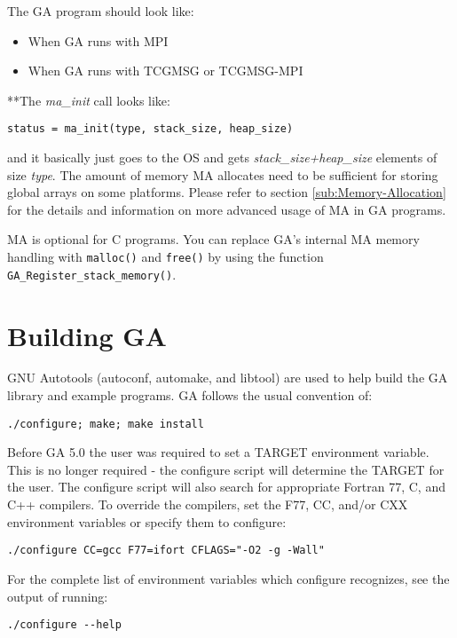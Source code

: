 The GA program should look like:
\begin{itemize}
\item When GA runs with MPI
\end{itemize}


\begin{itemize}
\item When GA runs with TCGMSG or TCGMSG-MPI
\end{itemize}


{*}{*}The \emph{ma\_init} call looks like:
\begin{verbatim}
status = ma_init(type, stack_size, heap_size)
\end{verbatim}
and it basically just goes to the OS and gets \emph{stack\_size+heap\_size}
elements of size \emph{type}. The amount of memory MA allocates need to be
sufficient for storing global arrays on some platforms. Please refer to section
\ref{sub:Memory-Allocation} for the details and information on more advanced
usage of MA in GA programs. 

MA is optional for C programs. You can replace GA's internal MA memory handling
with \texttt{malloc()} and \texttt{free()} by using the function
\texttt{GA\_Register\_stack\_memory()}.


\section{Building GA}

GNU Autotools (autoconf, automake, and libtool) are used to help build the GA
library and example programs. GA follows the usual convention of:
\begin{verbatim}
./configure; make; make install 
\end{verbatim}
Before GA 5.0 the user was required to set a TARGET environment variable. This
is no longer required - the configure script will determine the TARGET for the
user. The configure script will also search for appropriate Fortran 77, C, and
C++ compilers. To override the compilers, set the F77, CC, and/or CXX
environment variables or specify them to configure:
\begin{verbatim}
./configure CC=gcc F77=ifort CFLAGS="-O2 -g -Wall"
\end{verbatim}
For the complete list of environment variables which configure recognizes, see
the output of running: 
\begin{verbatim}
./configure --help
\end{verbatim}

